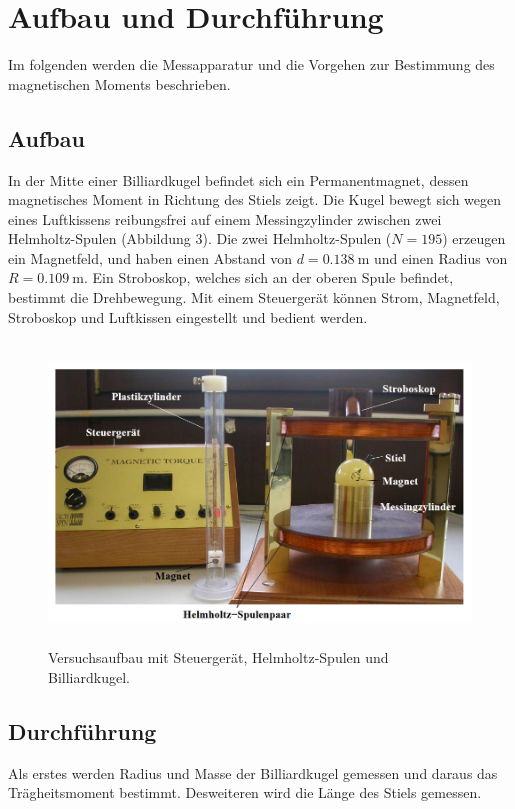 \section{Aufbau und Durchführung}
\label{sec:Durchführung}

Im folgenden werden die Messapparatur und die Vorgehen zur Bestimmung des magnetischen Moments beschrieben.

\subsection{Aufbau}

In der Mitte einer Billiardkugel befindet sich ein Permanentmagnet, dessen magnetisches Moment in Richtung des Stiels zeigt. 
Die Kugel bewegt sich wegen eines Luftkissens reibungsfrei auf einem Messingzylinder zwischen zwei Helmholtz-Spulen (Abbildung 3).  
Die zwei Helmholtz-Spulen ($N=195$) erzeugen ein Magnetfeld, und haben einen Abstand von $d=\SI{0.138}{\meter}$ und einen Radius von $R=\SI{0.109}{\meter}$.
Ein Stroboskop, welches sich an der oberen Spule befindet, bestimmt die Drehbewegung.
Mit einem Steuergerät können Strom, Magnetfeld, Stroboskop und Luftkissen eingestellt und bedient werden.

\begin{figure}[H]
  \centering
  \includegraphics[height=8cm]{Screenshot (3).png}
  \caption{Versuchsaufbau mit Steuergerät, Helmholtz-Spulen und Billiardkugel. \cite[S. 2]{kent}}
  \label{fig:drill}
\end{figure}


\subsection{Durchführung}
Als erstes werden Radius und Masse der Billiardkugel gemessen und daraus das Trägheitsmoment bestimmt. Desweiteren wird die Länge des Stiels gemessen.

